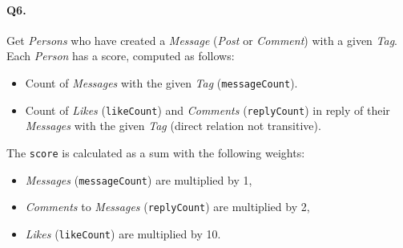 \paragraph{Q6.}
Get \emph{Persons} who have created a \emph{Message} (\emph{Post} or
\emph{Comment}) with a given \emph{Tag}.
Each \emph{Person} has a score, computed as follows:
\begin{itemize}
\tightlist
\item
  Count of \emph{Messages} with the given \emph{Tag}
  (\texttt{messageCount}).
\item
  Count of \emph{Likes} (\texttt{likeCount}) and \emph{Comments}
  (\texttt{replyCount}) in reply of their \emph{Messages} with the given
  \emph{Tag} (direct relation not transitive).
\end{itemize}
The \texttt{score} is calculated as a sum with the following weights:
\begin{itemize}
\tightlist
\item
  \emph{Messages} (\texttt{messageCount}) are multiplied by 1,
\item
  \emph{Comments} to \emph{Messages} (\texttt{replyCount}) are
  multiplied by 2,
\item
  \emph{Likes} (\texttt{likeCount}) are multiplied by 10.
\end{itemize}
